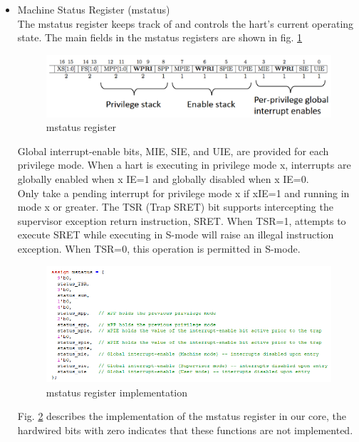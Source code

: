 \documentclass[../main.tex]{subfiles}
\begin{document}
\begin{itemize}
    \item Machine Status Register (mstatus)\\
        The mstatus register keeps track of and controls the hart’s current operating state.
        The main fields in the mstatus registers are shown in fig. \ref{fig:mstatus}
        \begin{figure}[h]
            \centering
            \includegraphics[width=10 cm]{diagrams/mstatus.png}
            \caption{mstatus register}
            \label{fig:mstatus}
        \end{figure}
        Global interrupt-enable bits, MIE, SIE, and UIE, are provided for each privilege mode. When a hart is executing in privilege mode x, interrupts are globally enabled when x IE=1 and globally disabled when x IE=0.\\
        Only take a pending interrupt for privilege mode x if xIE=1 and running in mode x or greater.
        The TSR (Trap SRET) bit supports intercepting the supervisor exception return instruction, SRET. When TSR=1, attempts to execute SRET while executing in S-mode will raise an illegal instruction exception. When TSR=0, this operation is permitted in S-mode.\\
        \begin{figure}[h]
            \centering
            \includegraphics[width=15 cm]{diagrams/mstatus-imp.png}
            \caption{mstatus register implementation}
            \label{fig:mstatus-imp}
        \end{figure}
        Fig. \ref{fig:mstatus-imp} describes the implementation of the mstatus register in our core, the hardwired bits with zero indicates that these functions are not implemented.\\
    

\end{itemize}
\end{document}
